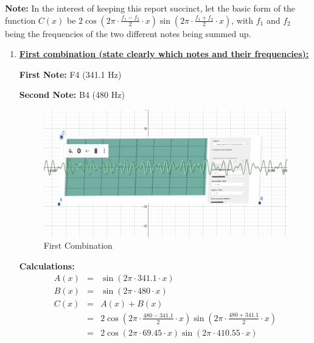 \documentclass[12pt,oneside]{article}
\begin{document}
\parttwo

\textbf{Note:} In the interest of keeping this report succinct, let the
basic form of the function \(C(x)\) be
\(2\cos\left(2\pi\cdot\frac{f_1 - f_2}{2}\cdot x\right)\sin\left(2\pi\cdot\frac{f_1 + f_2}{2}\cdot x\right)\),
with \(f_1\) and \(f_2\) being the frequencies of the two different
notes being summed up.

\begin{enumerate}

\item \underline{\bf First combination (state clearly which notes and their frequencies):}
\color{red}

\textbf{First Note:} F4 (341.1 Hz)

\par

\textbf{Second Note:} B4 (480 Hz)

\begin{figure}[H]

{\centering \includegraphics[width=15cm,]{./images/fandb} 

}

\caption{First Combination}\label{fig:combo-1}
\end{figure}

\textbf{Calculations:} \begin{eqnarray}
  A(x) & = & \sin (2\pi\cdot 341.1\cdot x) \\
  B(x) & = & \sin (2\pi\cdot 480 \cdot x) \\
  C(x) & = & A(x) + B(x) \\
       & = & 2\cos\left(2\pi\cdot\frac{480 - 341.1}{2}\cdot x\right)\sin\left(2\pi\cdot\frac{480 + 341.1}{2}\cdot x\right) \\
       & = & 2\cos\left(2\pi\cdot 69.45\cdot x\right)\sin\left(2\pi\cdot 410.55\cdot x\right)
\end{eqnarray}


\end{enumerate}
\end{document}
